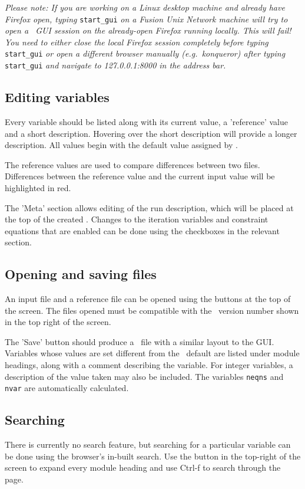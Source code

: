 \textit{Please note: If you are working on a Linux desktop machine and already
  have Firefox open, typing} \verb+start_gui+ \textit{on a Fusion Unix Network
  machine will try to open a \process\ GUI session on the already-open Firefox
  running locally. This will fail! You need to either close the local Firefox
  session completely before typing} \verb+start_gui+ \textit{or open a
  different browser manually (e.g.\ konqueror) after typing} \verb+start_gui+
\textit{and navigate to 127.0.0.1:8000 in the address bar.}

\subsection{Editing variables}
Every variable should be listed along with its current value, a 'reference'
value and a short description. Hovering over the short description will
provide a longer description. All values begin with the default value
assigned by \process. 

The reference values are used to compare differences between two files.
Differences between the reference value and the current input value will be
highlighted in red.

The 'Meta' section allows editing of the run description, which will be placed
at the top of the created \indat. Changes to the iteration variables and
constraint equations that are enabled can be done using the checkboxes in the
relevant section.

\subsection{Opening and saving files}
An input file and a reference file can be opened using the buttons at the top
of the screen. The files opened must be compatible with the \process\ version
number shown in the top right of the screen.

The 'Save' button should produce a \indat\ file with a similar
layout to the GUI. Variables whose values are set different from the
\process\ default are listed under module headings, along with a comment
describing the variable. For integer variables, a description of the value
taken may also be included. The variables \texttt{neqns} and \texttt{nvar} are automatically
calculated.

\subsection{Searching}
There is currently no search feature, but searching for a particular
variable can be done using the browser's in-built search. Use the button
in the top-right of the screen to expand every module heading and use Ctrl-f
to search through the page.

